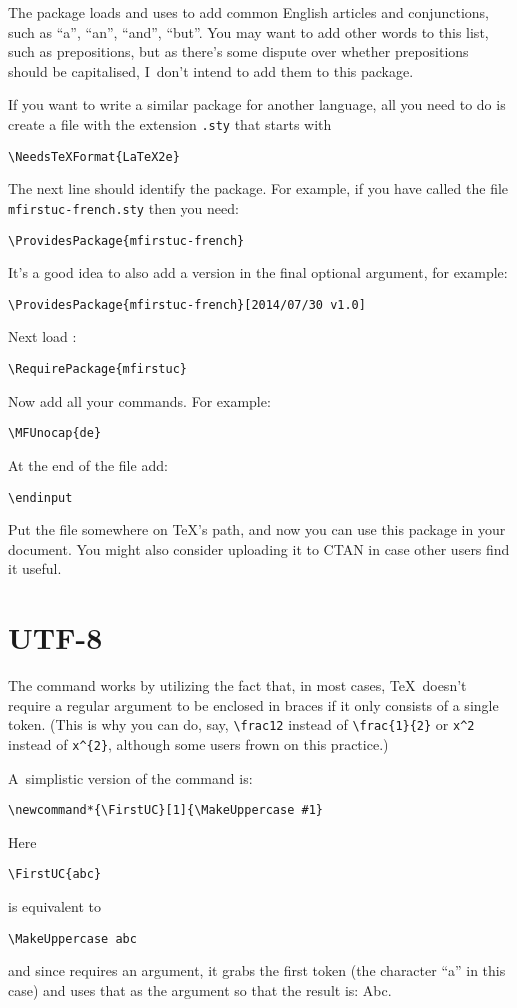 \documentclass{nlctdoc}
\begin{document}
The package  loads  and uses
 to add common English articles and conjunctions, such
as ``a'', ``an'', ``and'', ``but''. You may want to add other
words to this list, such as prepositions, but as there's some
dispute over whether prepositions should be capitalised, I~don't
intend to add them to this package.

If you want to write a similar package for another language, all you
need to do is create a file with the extension \texttt{.sty}
that starts with
\begin{verbatim}
\NeedsTeXFormat{LaTeX2e}
\end{verbatim}
The next line should identify the package. For example, if you have
called the file \texttt{mfirstuc-french.sty} then you need:
\begin{verbatim}
\ProvidesPackage{mfirstuc-french}
\end{verbatim}
It's a good idea to also add a version in the final optional
argument, for example:
\begin{verbatim}
\ProvidesPackage{mfirstuc-french}[2014/07/30 v1.0]
\end{verbatim}
Next load :
\begin{verbatim}
\RequirePackage{mfirstuc}
\end{verbatim}
Now add all your  commands. For example:
\begin{verbatim}
\MFUnocap{de}
\end{verbatim}
At the end of the file add:
\begin{verbatim}
\endinput
\end{verbatim}

Put the file somewhere on \TeX's path, and now you can use this
package in your document. You might also consider uploading it
to CTAN in case other users find it useful.

\section{UTF-8}
\label{sec:utf8}

The  command works by utilizing the fact that, in
most cases, \TeX\ doesn't require a regular argument to be enclosed
in braces if it only consists of a single token. (This is why you
can do, say, \verb|\frac12| instead of \verb|\frac{1}{2}| or
\verb|x^2| instead of \verb|x^{2}|, although some users
frown on this practice.)

A~simplistic version of the  command is:
\begin{verbatim}
\newcommand*{\FirstUC}[1]{\MakeUppercase #1}
\end{verbatim}
Here
\begin{verbatim}
\FirstUC{abc}
\end{verbatim}
is equivalent to
\begin{verbatim}
\MakeUppercase abc
\end{verbatim}
and since  requires an argument, it grabs the
first token (the character ``a'' in this case) and uses that as the
argument so that the result is: Abc.
\end{document}
